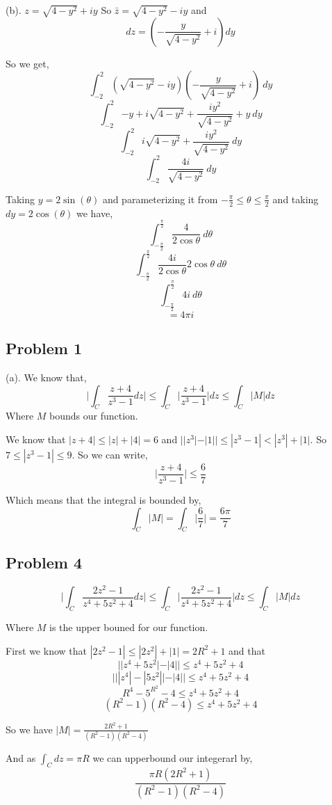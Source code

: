 \documentclass[a4paper]{report}
\begin{document}
(b). $z = \sqrt{4 - y^2} + iy$ So $\bar z = \sqrt{4 - y^2} - iy$ and 
$$ dz = (-\frac{y}{\sqrt{4-y^2}} + i) dy $$ 

So we get, 
$$ \int_{{-2}}^{{2}} {(\sqrt{4 - y^2} - iy)(-\frac{y}{\sqrt{4 - y^2}} +i)} \: d{y} {} $$ 
$$ \int_{{-2}}^{{2}} {-y + i\sqrt{4- y^2} + \frac{iy^2}{\sqrt{4 - y^2}} + y} \: d{y} {} $$ 
$$ \int_{{-2}}^{{2}} { i\sqrt{4- y^2} + \frac{iy^2}{\sqrt{4 - y^2}} } \: d{y} {} $$ 
$$ \int_{{-2}}^{{2}} { \frac{4i}{\sqrt{4 - y^2}} } \: d{y} {} $$ 

Taking $y = 2\sin(\theta)$ and parameterizing it from $-\frac{\pi}{2} \le \theta \le \frac{\pi}{2} $ and taking $dy = 2\cos(\theta)$ we have, 
$$ \int_{{-\frac{\pi}{2}}}^{{\frac{\pi}{2}}} {\frac{4}{2\cos\theta}} \: d{\theta} {} $$ 
$$ \int_{{-\frac{\pi}{2}}}^{{\frac{\pi}{2}}} {\frac{4i}{2\cos\theta} 2\cos \theta } \: d{\theta} {} $$ 
$$ \int_{{-\frac{\pi}{2}}}^{{\frac{\pi}{2}}} {4i} \: d{\theta} {} $$ 
$$ = 4\pi i $$ 


\subsection*{Problem 1}
(a). We know that, 
$$ \bigg | \int_C \frac{z + 4}{z^{3} - 1} dz\bigg | \le \int_C \bigg | \frac{z + 4}{z^{3} - 1}\bigg | dz \le \int_C | M | dz$$ 
Where $M$ bounds our function.

We know that $ |z + 4| \le |z| + |4| = 6$ and  $||z^{3}| - |1|| \le |z^{3} - 1| < |z^{3}| + |1| $. So $7 \le |z^{3} - 1| \le 9$. So we can write, 
$$ \bigg | \frac{z + 4}{z^{3} - 1} \bigg| \le \frac{6}{7} $$ 

Which means that the integral is bounded by, 
$$ \int_C |M| = \int_C \bigg|\frac{6}{7}\bigg|  = \frac{6\pi}{7}$$ 


\subsection*{Problem 4}

$$ \bigg | \int_C \frac{2z^2 - 1}{z^{4} + 5z^2 + 4} dz\bigg | \le \int_C \bigg | \frac{2z^2 - 1}{z^{4} + 5z^2 + 4}\bigg | dz \le \int_C | M | dz$$ 

Where $M$ is the upper bouned for our function.

First we know that $|2z^2 - 1|\le  |2z^2| + |1| = 2R^2 + 1$ and that 
$$ ||z^{4} + 5z^2| - |4||  \le z^{4} + 5z^2 + 4$$ 
$$  |||z^{4}| - |5z^2|| - |4|| \le z^{4} + 5z^2  + 4$$ 
$$ R^{4} - 5^{R^2} - 4 \le z^{4}+ 5z^2 + 4 $$ 
$$ (R^2 - 1)(R^2 - 4) \le z^{4}+ 5z^2 + 4 $$ 

So we have $|M| = \frac{2R^2 + 1}{(R^2 - 1)(R^2 - 4)}$ 

And as $\int_C dz = \pi R$ we can upperbound our integerarl by, 
$$ \frac{\pi R (2R^2 + 1)}{(R^2 - 1)(R^2 - 4)} $$ 


$$  $$ 
\end{document}

